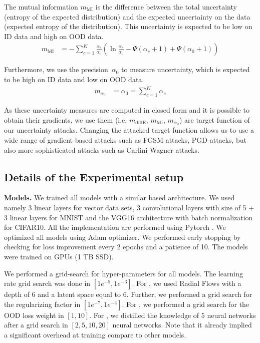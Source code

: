 The mutual information $m_{\mathrm{MI}}$ is the difference between the total uncertainty (entropy of the expected distribution) and the expected uncertainty on the data (expected entropy of the distribution). This uncertainty is expected to be low on ID data and high on OOD data. 
%
\begin{equation}
\begin{aligned}
	m_{\mathrm{MI}}  &= - \sum_{c=1}^{K} \frac{\alpha_c}{\alpha_0} \left( \ln \frac{\alpha_c}{\alpha_0} - \Psi(\alpha_c +1) + \Psi (\alpha_0 +1) \right)
\end{aligned}
\end{equation}

Furthermore, we use the precision~$\alpha_0$ to measure uncertainty, which is expected to be high on ID data and low on OOD data.
%
\begin{equation}
\begin{aligned}
	m_{\alpha_0}        &= \alpha_0 = \sum_{c=1}^{K} \alpha_c 
\end{aligned}
\end{equation}


As these uncertainty measures are computed in closed form and it is possible to obtain their gradients, we use them (i.e. $m_{\mathrm{diffE}}$, $m_{\mathrm{MI}}$, $m_{\alpha_0}$) are target function of our uncertainty attacks. Changing the attacked target function allows us to use a wide range of gradient-based attacks such as FGSM attacks, PGD attacks, but also more sophisticated attacks such as Carlini-Wagner attacks. 



\subsection{Details of the Experimental setup}
\label{subsec:exp_setup}

\textbf{Models.} We trained all models with a similar based architecture. We used namely 3 linear layers for vector data sets, 3 convolutional layers with size of 5 + 3 linear layers for MNIST and the VGG16 \cite{vgg} architecture with batch normalization for CIFAR10. All the implementation are performed using Pytorch \citep{pytorch}. We optimized all models using Adam optimizer. We performed early stopping by checking for loss improvement every 2 epochs and a patience of 10. The models were trained on GPUs (1 TB SSD).

We performed a grid-search for hyper-parameters for all models. The learning rate grid search was done in $[1e^{-5}, 1e^{-3}]$. For \PostNet, we used Radial Flows with a depth of 6 and a latent space equal to 6. Further, we performed a grid search for the regularizing factor in $[1e^{-7}, 1e^{-4}]$. For \PriorNet, we performed a grid search for the OOD loss weight in $[1, 10]$. For \DDNet, we distilled the knowledge of $5$ neural networks after a grid search in $[2, 5, 10, 20]$ neural networks. Note that it already implied a significant overhead at training compare to other models.

